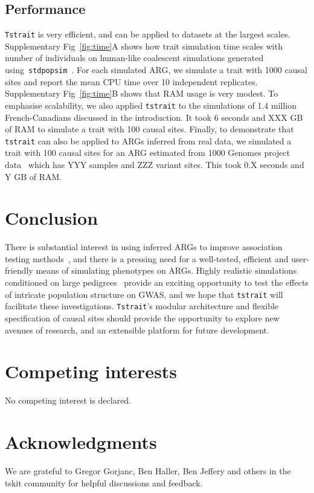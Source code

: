 \documentclass[unnumsec,webpdf,modern,large,namedate]{oup-authoring-template}%
\begin{document}
\subsection{Performance}
\texttt{Tstrait} is very efficient, and can be applied to datasets at the
largest scales.
Supplementary Fig~\ref{fig:time}A shows how trait simulation time scales
with number of individuals on human-like coalescent simulations
generated using~\texttt{stdpopsim}~\citep{adrion2020}.
For each simulated ARG, we simulate a trait with 1000 causal sites
and report the mean CPU time over 10 independent replicates.
Supplementary Fig~\ref{fig:time}B shows that RAM usage is very
modest. To emphasise scalability, we also
applied \texttt{tstrait} to the simulations of 1.4 million
French-Canadians discussed in the introduction.
It took 6 seconds and XXX GB of RAM to
simulate a trait with 100 causal sites.
Finally, to demonstrate that \texttt{tstrait} can also be applied
to ARGs inferred from real data, we simulated a trait with 100 causal
sites for an ARG estimated from 1000 Genomes project
data~\citep{kelleher2019} which has YYY samples
and ZZZ variant sites. This took 0.X seconds and Y GB of RAM.

\section{Conclusion}
There is substantial interest in using inferred ARGs to improve
association testing
methods~\citep{zhang2023,link2023tree,nowbandegani2023extremely},
and there is a pressing need for a well-tested, efficient
and user-friendly means of simulating phenotypes on ARGs.
Highly realistic simulations conditioned on large
pedigrees~\citep{anderson2023} provide an exciting opportunity
to test the effects of intricate population structure on
GWAS, and we hope that \texttt{tstrait} will facilitate these
investigations. \texttt{Tstrait}'s modular architecture
and flexible specification of causal sites
should provide the opportunity to explore new avenues of research,
and an extensible platform for future development.

\section{Competing interests}
No competing interest is declared.

\section{Acknowledgments}
We are grateful to Gregor Gorjanc, Ben Haller, Ben Jeffery and
others in the tskit community for helpful discussions and feedback.
\end{document}
